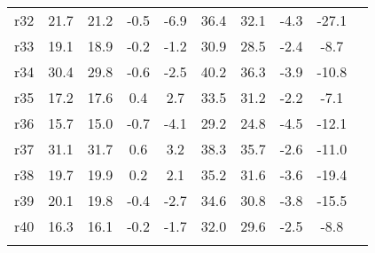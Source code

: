 \begin{tabular*}{\hsize}{ @{\extracolsep{\fill}}l*{9}{c}}
%
r32                      &21.7     &21.2     &-0.5     &-6.9     &36.4     &32.1     &-4.3     &-27.1\\
%
r33                      &19.1     &18.9     &-0.2     &-1.2     &30.9     &28.5     &-2.4     &-8.7\\
%
r34                      &30.4     &29.8     &-0.6     &-2.5     &40.2     &36.3     &-3.9     &-10.8\\
%
r35                      &17.2     &17.6     & 0.4     & 2.7     &33.5     &31.2     &-2.2     &-7.1\\
%
r36                      &15.7     &15.0     &-0.7     &-4.1     &29.2     &24.8     &-4.5     &-12.1\\
%
r37                      &31.1     &31.7     & 0.6     & 3.2     &38.3     &35.7     &-2.6     &-11.0\\
%
r38                      &19.7     &19.9     & 0.2     & 2.1     &35.2     &31.6     &-3.6     &-19.4\\
%
r39                      &20.1     &19.8     &-0.4     &-2.7     &34.6     &30.8     &-3.8     &-15.5\\
%
r40                      &16.3     &16.1     &-0.2     &-1.7     &32.0     &29.6     &-2.5     &-8.8\\
\\
\hline \hline
\end{tabular*}

